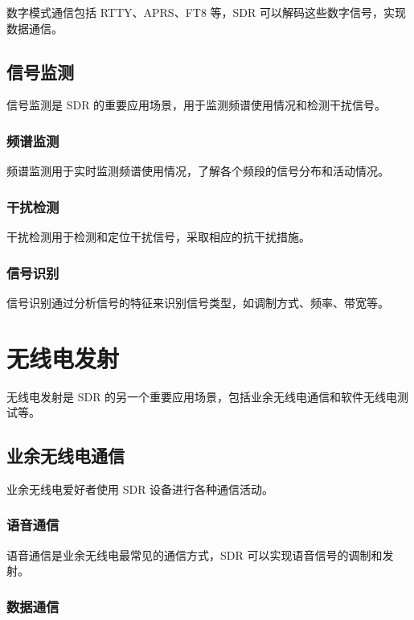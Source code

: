 \documentclass[UTF8]{ctexbook}
\begin{document}
数字模式通信包括 RTTY、APRS、FT8 等，SDR 可以解码这些数字信号，实现数据通信。

\subsection{信号监测}

信号监测是 SDR 的重要应用场景，用于监测频谱使用情况和检测干扰信号。

\subsubsection{频谱监测}

频谱监测用于实时监测频谱使用情况，了解各个频段的信号分布和活动情况。

\subsubsection{干扰检测}

干扰检测用于检测和定位干扰信号，采取相应的抗干扰措施。

\subsubsection{信号识别}

信号识别通过分析信号的特征来识别信号类型，如调制方式、频率、带宽等。

\section{无线电发射}

无线电发射是 SDR 的另一个重要应用场景，包括业余无线电通信和软件无线电测试等。

\subsection{业余无线电通信}

业余无线电爱好者使用 SDR 设备进行各种通信活动。

\subsubsection{语音通信}

语音通信是业余无线电最常见的通信方式，SDR 可以实现语音信号的调制和发射。

\subsubsection{数据通信}
\end{document}
